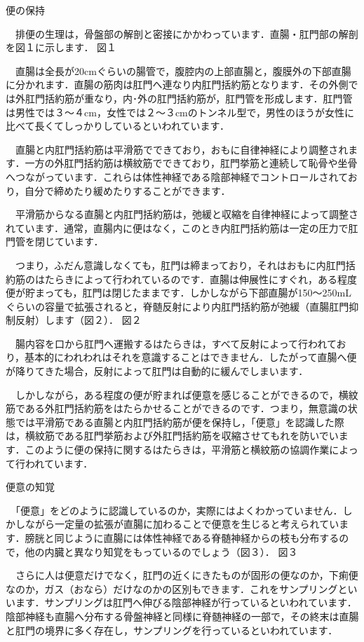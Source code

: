 便の保持

　排便の生理は，骨盤部の解剖と密接にかかわっています．直腸・肛門部の解剖を図１に示します．
図１

　直腸は全長が20cmぐらいの腸管で，腹腔内の上部直腸と，腹膜外の下部直腸に分かれます．直腸の筋肉は肛門へ連なり内肛門括約筋となります．その外側では外肛門括約筋が重なり，内･外の肛門括約筋が，肛門管を形成します．肛門管は男性では３～４cm，女性では２～３cmのトンネル型で，男性のほうが女性に比べて長くてしっかりしているといわれています．

　直腸と内肛門括約筋は平滑筋でできており，おもに自律神経により調整されます．一方の外肛門括約筋は横紋筋でできており，肛門挙筋と連続して恥骨や坐骨へつながっています．これらは体性神経である陰部神経でコントロールされており，自分で締めたり緩めたりすることができます．

　平滑筋からなる直腸と内肛門括約筋は，弛緩と収縮を自律神経によって調整されています．通常，直腸内に便はなく，このとき内肛門括約筋は一定の圧力で肛門管を閉じています．

　つまり，ふだん意識しなくても，肛門は締まっており，それはおもに内肛門括約筋のはたらきによって行われているのです．直腸は伸展性にすぐれ，ある程度便が貯まっても，肛門は閉じたままです．しかしながら下部直腸が150～250mLぐらいの容量で拡張されると，脊髄反射により内肛門括約筋が弛緩（直腸肛門抑制反射）します（図２）．
図２

　腸内容を口から肛門へ運搬するはたらきは，すべて反射によって行われており，基本的にわれわれはそれを意識することはできません．したがって直腸へ便が降りてきた場合，反射によって肛門は自動的に緩んでしまいます．

　しかしながら，ある程度の便が貯まれば便意を感じることができるので，横紋筋である外肛門括約筋をはたらかせることができるのです．つまり，無意識の状態では平滑筋である直腸と内肛門括約筋が便を保持し，「便意」を認識した際は，横紋筋である肛門挙筋および外肛門括約筋を収縮させてもれを防いでいます．このように便の保持に関するはたらきは，平滑筋と横紋筋の協調作業によって行われています．

便意の知覚

　「便意」をどのように認識しているのか，実際にはよくわかっていません．しかしながら一定量の拡張が直腸に加わることで便意を生じると考えられています．膀胱と同じように直腸には体性神経である脊髄神経からの枝も分布するので，他の内臓と異なり知覚をもっているのでしょう（図３）．
図３

　さらに人は便意だけでなく，肛門の近くにきたものが固形の便なのか，下痢便なのか，ガス（おなら）だけなのかの区別もできます．これをサンプリングといいます．サンプリングは肛門へ伸びる陰部神経が行っているといわれています．陰部神経も直腸へ分布する骨盤神経と同様に脊髄神経の一部で，その終末は直腸と肛門の境界に多く存在し，サンプリングを行っているといわれています．

